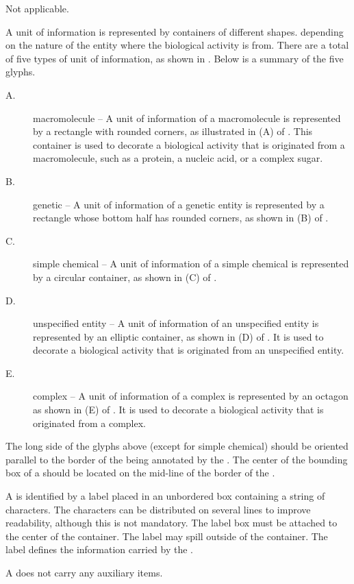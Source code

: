 \begin{glyphDescription}

\glyphSboTerm Not applicable.

\glyphContainer A unit of information is represented by containers of different shapes. depending on the nature of the entity where the biological activity is from. There are a total of five types of unit of information, as shown in .   Below is a summary of the five glyphs.

\begin{description}
\item[A.] macromolecule -- A unit of information of a macromolecule is represented by a rectangle with rounded corners, as illustrated in (A) of .  This container is used to decorate a biological activity that is originated from a macromolecule, such as a protein, a nucleic acid, or a complex sugar.

\item[B.] genetic -- A unit of information of a genetic entity is represented by a rectangle whose bottom half has rounded corners, as shown in (B) of  .

\item[C.] simple chemical -- A unit of information of a simple chemical is represented by a circular container, as shown in (C) of .

\item[D.] unspecified entity -- A unit of information of an unspecified entity is represented by an elliptic container, as shown in (D) of .  It is used to decorate a biological activity that is originated from an unspecified entity.

\item[E.] complex -- A unit of information of a complex is represented by an octagon as shown in (E) of .  It is used to decorate a biological activity that is originated from a complex.
\end{description}

The long side of the glyphs above (except for simple chemical) should be oriented parallel to the border of the  being annotated by the . The center of the bounding box of a  should be located on the mid-line of the border of the .

\glyphLabel A  is identified by a label placed in an unbordered box containing a string of characters. The characters can be distributed on several lines to improve readability, although this is not mandatory.  The label box must be attached to the center of the container. The label may spill outside of the container.  The label defines the information carried by the .

\glyphAux A  does not carry any auxiliary items.

\end{glyphDescription}

